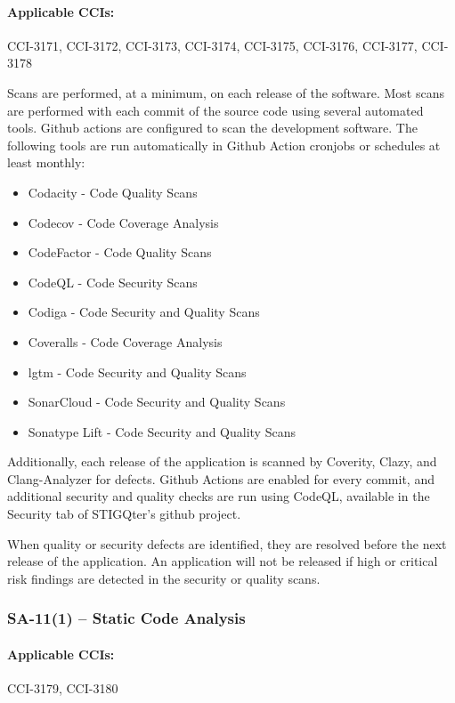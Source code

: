 \documentclass[letterpaper, 10pt, twoside]{article}
\begin{document}
\paragraph{Applicable CCIs:} CCI-3171, CCI-3172, CCI-3173, CCI-3174, CCI-3175, CCI-3176, CCI-3177, CCI-3178

Scans are performed, at a minimum, on each release of the software. Most scans are performed with each commit of the source code using several automated tools. Github actions are configured to scan the development software. The following tools are run automatically in Github Action cronjobs or schedules at least monthly:
\begin{itemize}
	\item Codacity - Code Quality Scans
	\item Codecov - Code Coverage Analysis
	\item CodeFactor - Code Quality Scans
	\item CodeQL - Code Security Scans
	\item Codiga - Code Security and Quality Scans
	\item Coveralls - Code Coverage Analysis
	\item lgtm - Code Security and Quality Scans
	\item SonarCloud - Code Security and Quality Scans
	\item Sonatype Lift - Code Security and Quality Scans
\end{itemize}

Additionally, each release of the application is scanned by Coverity, Clazy, and Clang-Analyzer for defects. Github Actions are enabled for every commit, and additional security and quality checks are run using CodeQL, available in the Security tab of STIGQter's github project.

When quality or security defects are identified, they are resolved before the next release of the application. An application will not be released if high or critical risk findings are detected in the security or quality scans.

\subsubsection{SA-11(1) -- Static Code Analysis}

\paragraph{Applicable CCIs:} CCI-3179, CCI-3180
\end{document}
